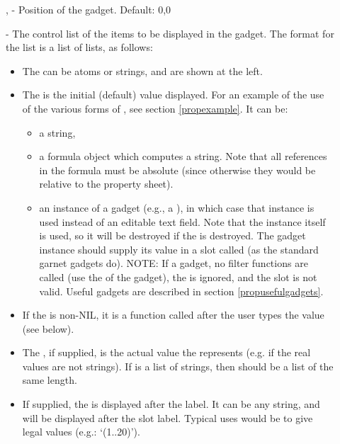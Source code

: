 \begin{description}
\item[] ,  - Position of the gadget.  Default: 0,0

\item[]  - The control list of the items to be displayed in the gadget.
The format for the list is a list of lists, as follows:

\begin{itemize}
\item The  can be atoms or strings, and are shown at the left.

\item 
The  is the initial (default) value displayed.  For an example
of the use of the various forms of , see section
\ref{propexample}.  It can be:
\begin{itemize}
\item a string,

\item a formula object which computes a string.  Note
that all references in the formula must be absolute
(since otherwise they would be relative to the property sheet).

\item an instance of a gadget (e.g., a ), in which case
that instance is used instead of an editable text field.
Note that the instance itself is used, so it will be destroyed if the
 is destroyed.
The gadget instance should supply its value in a slot called 
(as the standard garnet gadgets do).  NOTE: If a gadget, no
filter functions are called (use the 
of the gadget), the  is ignored, and the  slot
is not valid.  Useful gadgets are described
in section \ref{propusefulgadgets}.
\end{itemize}


\item If the  is non-NIL, it is a function called after the
user types the value (see below).

\item The , if supplied, is the actual value the 
represents (e.g. if the real values are not strings).  If
 is a list of strings, then  should be a list
of the same length.

\item If supplied, the  is displayed after the label.
It can be any string, and will be displayed
after the slot label.  Typical uses would be to
give legal values (e.g.: `(1..20)').
\end{itemize}


\end{description}
